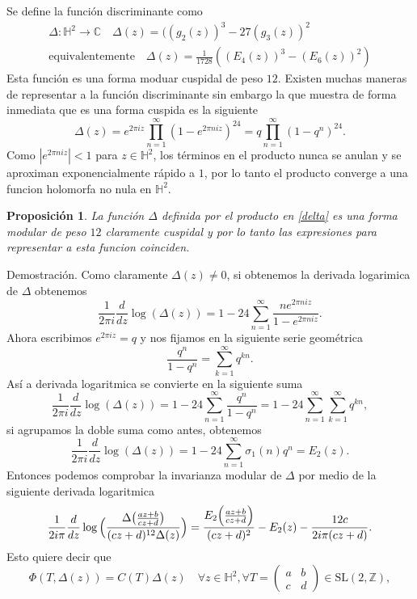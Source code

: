 \documentclass[letterpaper]{article}
\newtheorem{prop}[teorema]{Proposici\'on}
\newcommand{\dem}{{\noindent \sc Demostraci\'on. }}
\newcommand{\co}{\ensuremath{\mathbb C }}
\newcommand{\hd}{\ensuremath{\mathbb H^2}}
\newcommand{\slz}{\ensuremath{\mathrm{SL}(2,\mathbb Z) }}
\begin{document}
\noindent Se define la función discriminante como
    \begin{align*}
        \Delta:\hd\rightarrow\co\quad\Delta(z)=((g_2(z))^3-27(g_3(z))^2\\
        \text{equivalentemente}\quad \Delta(z)=\frac{1}{1728}((E_4(z))^3-(E_6(z))^2)
    \end{align*}
Esta función es una forma moduar cuspidal de peso \(12\). Existen muchas maneras de representar a la función discriminante sin embargo la que muestra de forma inmediata que es una forma cuspida es la siguiente
\begin{equation}\label{delta}
    \Delta(z)=e^{2\pi iz}\prod_{n=1}^{\infty}(1-e^{2\pi niz})^{24}=q\prod_{n=1}^{\infty}(1-q^n)^{24}.
\end{equation}
Como \(|e^{2\pi niz}|<1\) para \(z\in\hd\), los términos en el producto nunca se anulan y se aproximan exponencialmente rápido a \(1\), por lo tanto el producto converge a una funcion holomorfa no nula en \(\hd\).
\begin{prop}
La función \(\Delta\) definida por el producto en \ref{delta} es una forma modular de peso \(12\) claramente cuspidal y por lo tanto las expresiones para representar a esta funcion coinciden.
\end{prop}
\dem Como claramente \(\Delta(z)\neq0\), si obtenemos la derivada logarimica de \(\Delta\) obtenemos
\[
\frac{1}{2\pi i}\dfrac{d}{dz}\log(\Delta(z))=1-24\sum_{n=1}^{\infty}\frac{ne^{2\pi niz}}{1-e^{2\pi niz}}.
\]
Ahora escribimos \(e^{2\pi i z}=q\) y nos fijamos en la siguiente serie geométrica
\[
\frac{q^n}{1-q^n}=\sum_{k=1}^{\infty}q^{kn}.
\]
Así a derivada logaritmica se convierte en la siguiente suma
\[
 \frac{1}{2\pi i}\dfrac{d}{dz}\log(\Delta(z))=1-24\sum_{n=1}^{\infty}\frac{q^n}{1-q^n}=1-24\sum_{n=1}^{\infty}\sum_{k=1}^{\infty}q^{kn},
\]
\noindent si agrupamos la doble suma como antes, obtenemos
\[
\frac{1}{2\pi i}\dfrac{d}{dz}\log(\Delta(z))=1-24\sum_{n=1}^{\infty}\sigma_1(n)q^n=E_2(z).
\]
Entonces podemos comprobar la invarianza modular de \(\Delta\) por medio de la siguiente derivada logaritmica
\begin{equation}
\frac{1}{2i\pi}\dfrac{d}{dz}\log\Big(\frac{\Delta\big(\frac{az+b}{cz+d}\big)}{(cz+d)^{12}\Delta(z)}\Big)=
\frac{E_2\Big(\frac{az+b}{cz+d}\Big)}{(cz+d)^2}-E_2(z)-\frac{12c}{2i\pi(cz+d)}.\\
\end{equation}
\noindent Esto quiere decir que
\[
    \Phi(T,\Delta(z))=C(T)\Delta(z)\quad\forall z\in\hd,\forall T=\begin{pmatrix}a & b\\ c & d \end{pmatrix}\in\slz,
\]
\end{document}
